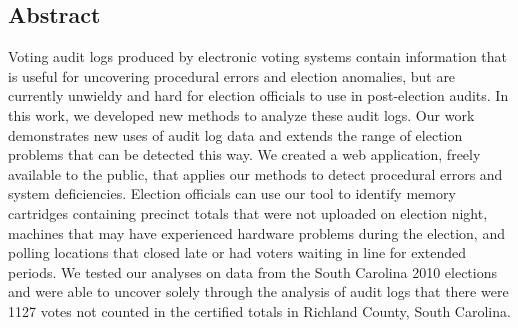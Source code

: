 
\subsection*{Abstract}
Voting audit logs produced by electronic voting systems contain information that is useful for uncovering procedural errors and election anomalies, but are currently unwieldy and hard for election officials to use in post-election audits. In this work, we developed new methods to analyze these audit logs. Our work demonstrates new uses of audit log data and extends the range of election problems that can be detected this way. We created a web application, freely available to the public, that applies our methods to detect procedural errors and system deficiencies.  Election officials can use our tool to identify memory cartridges containing precinct totals that were not uploaded on election night, machines that may have experienced hardware problems during the election, and polling locations that closed late or had voters waiting in line for extended periods. We tested our analyses on data from the South Carolina 2010 elections and were able to uncover solely through the analysis of audit logs that there were 1127 votes not counted in the certified totals in Richland County, South Carolina.

